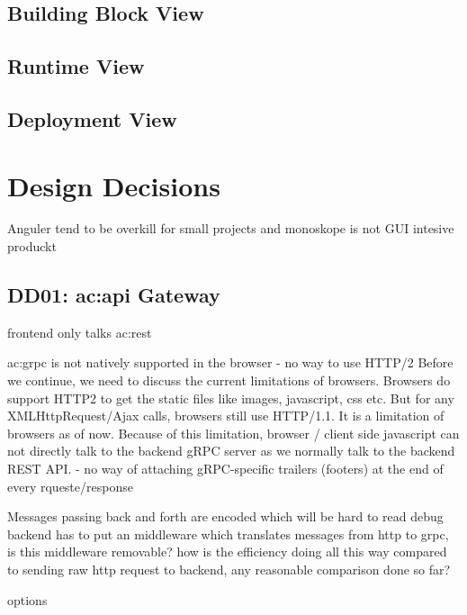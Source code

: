 \subsection{Building Block View}

\subsection{Runtime View}

\subsection{Deployment View}

\section{Design Decisions}

Anguler tend to be overkill for small projects and monoskope is not GUI intesive produckt

\subsection{DD01: \gls{ac:api} Gateway}

frontend only talks \gls{ac:rest}


\gls{ac:grpc} is not natively supported in the browser 
- no way to use HTTP/2
Before we continue, we need to discuss the current limitations of browsers. Browsers do support HTTP2 to get the static files like images, javascript, css etc. But for any XMLHttpRequest/Ajax calls, browsers still use HTTP/1.1. It is a limitation of browsers as of now. Because of this limitation, browser / client side javascript can not directly talk to the backend gRPC server as we normally talk to the backend REST API. 
- no way of attaching gRPC-specific trailers (footers) at the end of every rqueste/response

Messages passing back and forth are encoded which will be hard to read debug
backend has to put an middleware which translates messages from http to grpc, is this middleware removable?
how is the efficiency doing all this way compared to sending raw http request to backend, any reasonable comparison done so far?

options

